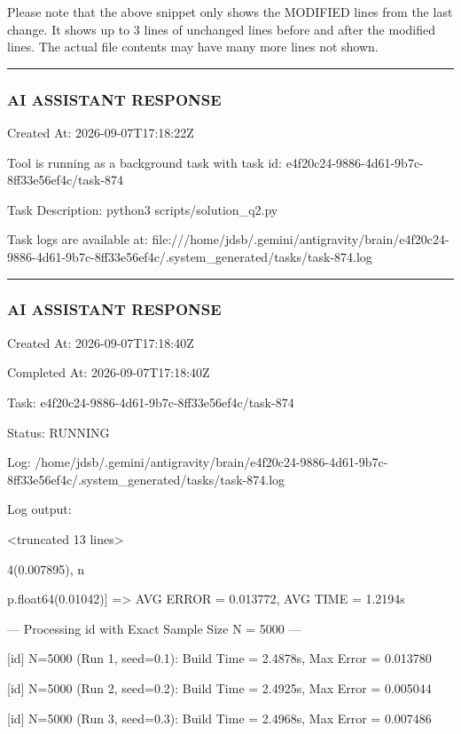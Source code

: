 \documentclass[11pt,a4paper]{article}
\begin{document}
{\begin{itemize}

\end{itemize}

Please note that the above snippet only shows the MODIFIED lines from the last change. It shows up to 3 lines of unchanged lines before and after the modified lines. The actual file contents may have many more lines not shown.


\hrule

\subsubsection{AI ASSISTANT RESPONSE}

Created At: 2026-09-07T17:18:22Z

Tool is running as a background task with task id: e4f20c24-9886-4d61-9b7c-8ff33e56ef4c/task-874

Task Description: python3 scripts/solution\_q2.py

Task logs are available at: file:///home/jdsb/.gemini/antigravity/brain/e4f20c24-9886-4d61-9b7c-8ff33e56ef4c/.system\_generated/tasks/task-874.log


\hrule

\subsubsection{AI ASSISTANT RESPONSE}

Created At: 2026-09-07T17:18:40Z

Completed At: 2026-09-07T17:18:40Z

Task: e4f20c24-9886-4d61-9b7c-8ff33e56ef4c/task-874

Status: RUNNING

Log: /home/jdsb/.gemini/antigravity/brain/e4f20c24-9886-4d61-9b7c-8ff33e56ef4c/.system\_generated/tasks/task-874.log

Log output:

<truncated 13 lines>

4(0.007895), n

p.float64(0.01042)] => AVG ERROR = 0.013772, AVG TIME = 1.2194s

--- Processing id with Exact Sample Size N = 5000 ---

[id] N=5000 (Run 1, seed=0.1): Build Time = 2.4878s, Max Error = 0.013780

[id] N=5000 (Run 2, seed=0.2): Build Time = 2.4925s, Max Error = 0.005044

[id] N=5000 (Run 3, seed=0.3): Build Time = 2.4968s, Max Error = 0.007486

}
\end{document}
